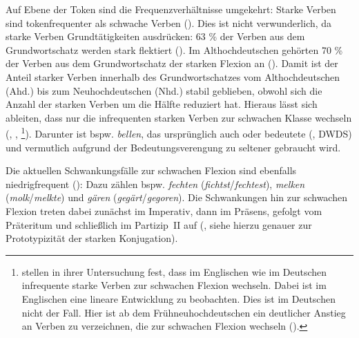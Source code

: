 Auf Ebene der Token sind die Frequenzverhältnisse umgekehrt: Starke Verben sind tokenfrequenter als schwache Verben (\cite[257]{Augst.1975}). Dies ist nicht verwunderlich, da starke Verben Grundtätigkeiten ausdrücken: 63 \% der Verben aus dem Grundwortschatz werden stark flektiert (\cite[258]{Augst.1975}). Im Althochdeutschen gehörten 70 \% der Verben aus dem Grundwortschatz der starken Flexion an (\cite[258]{Augst.1975}). Damit ist der Anteil starker Verben innerhalb des Grundwortschatzes vom Althochdeutschen (Ahd.) bis zum Neuhochdeutschen (Nhd.) stabil geblieben, obwohl sich die Anzahl der starken Verben um die Hälfte reduziert hat. Hieraus lässt sich ableiten, dass nur die infrequenten starken Verben zur schwachen Klasse wechseln (\cite{Augst.1975}, \cite[195]{Nubling.1998}, \cite{Carroll.2012}\footnote{\textcite{Carroll.2012} stellen in ihrer Untersuchung fest, dass im Englischen wie im Deutschen infrequente starke Verben zur schwachen Flexion wechseln. Dabei ist im Englischen eine lineare Entwicklung zu beobachten. Dies ist im Deutschen nicht der Fall. Hier ist  ab dem Frühneuhochdeutschen ein deutlicher Anstieg an Verben zu verzeichnen, die zur schwachen Flexion wechseln (\cite[168--169]{Carroll.2012}).}). Darunter ist bspw. \textit{bellen}, das ursprünglich auch  oder  bedeutete  (\cite{BerlinBrandenburgischeAkademiederWissenschaften.2019}, DWDS) und vermutlich aufgrund der Bedeutungsverengung zu  seltener gebraucht wird. 

Die aktuellen Schwankungsfälle zur schwachen Flexion sind ebenfalls niedrigfrequent (\cite[149]{Nowak.2016}): Dazu zählen bspw. \textit{fechten} (\textit{fichtst}/\textit{fechtest}), \textit{melken} (\textit{molk}/\textit{melkte}) und \textit{gären} (\textit{gegärt}/\textit{gegoren}). Die Schwankungen hin zur schwachen Flexion treten dabei zunächst im Imperativ, dann im Präsens, gefolgt vom Präteritum und schließlich im Partizip~II auf (\cite[78--79]{Bittner.1996}, siehe hierzu genauer  zur Prototypizität der starken Konjugation).

